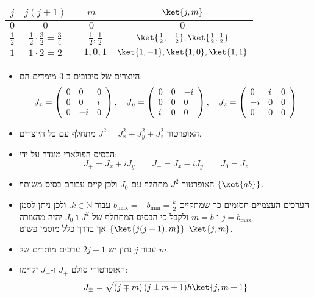 \documentclass{tstextbook}
\begin{document}
\begin{table}[htbp]
  \centering
  \begin{tabular}{|cccc|}
    \hline
    \(j\) & \(j(j+1)\) & \(m\) & \(\ket{j,m}\) \\ \hline
    \(0\) & \(0\) & \(0\) & \(0\) \\ \hline
    \(\frac{1}{2}\) & \(\frac{1}{2}\cdot \frac{3}{2}=\frac{3}{4}\) & \(-\frac{1}{2},\frac{1}{2}\) & \(\ket{\frac{1}{2},-\frac{1}{2}},\ket{\frac{1}{2},\frac{1}{2}}\) \\ \hline
    \(1\) & \(1\cdot 2 = 2\) & \(-1,0,1\) & \(\ket{1,-1},\ket{1,0},\ket{1,1}\) \\ \hline
  \end{tabular}
\end{table}
\begin{summary}
  \begin{itemize}
    \item היוצרים של סיבובים ב-3 מימדים הם:
$$J_{x}=\left(\begin{array}{l l l}{{0}}&{{0}}&{{0}}\\ {{0}}&{{0}}&{{i}}\\ {{0}}&{{-i}}&{{0}}\end{array}\right),\quad J_{y}=\left(\begin{array}{l l l}{{0}}&{{0}}&{{-i}}\\ {{0}}&{{0}}&{{0}}\\ {{i}}&{{0}}&{{0}}\end{array}\right),\quad J_{z}=\left(\begin{array}{l l l}{{0}}&{{i}}&{{0}}\\ {{-i}}&{{0}}&{{0}}\\ {{0}}&{{0}}&{{0}}\end{array}\right)$$
    \item האופרטור \(J^{2}=J_{x}^{2}+J_{y}^{2}+J_{z}^{2}\) מתחלף עם כל היוצרים.
    \item הבסיס הפולארי מוגדר על ידי:
$$J_{+}=J_{x}+ i J_{y}\qquad J_{-}=J_{x}- i J_{y}\qquad J_{0}=J_{z}$$
    \item האופרטור \(J^{2}\) מתחלף עם \(J_{0}\) ולכן קיים עבורם בסיס משותף \(\{ \ket{ab} \}\).
    \item הערכים העצמיים חסומים כך שמתקיים \(b_{\text{max}}=-b_{\min}=\frac{k}{2}\) עבור \(k \in \mathbb{N}\). ולכן ניתן לסמן \(j=b_{\text{max}}\) ו-\(m=b\) ולקבל כי הבסיס המתחלף של \(J^{2}\) ו-\(J_{0}\) יהיה מהצורה \(\left\{  \ket{j(j+1),m}  \right\}\) אך בדרך כלל מוסמן פשוט \(\ket{j,m}\).
    \item עבור \(j\) נתון יש \(2j+1\) ערכים מותרים של \(m\).
    \item האופרטורי סולם \(J_{+}\) ו-\(J_{-}\) יקיימו:
$$J_{\pm} = \sqrt{ \left( j\mp m \right)\left( j \pm m + 1 \right) } \hbar \ket{j,m+1} $$
  \end{itemize}
\end{summary}
\end{document}
